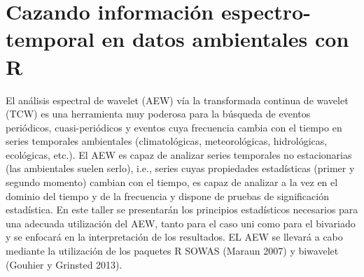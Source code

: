 \chapter{Cazando información espectro-temporal en datos ambientales con R}




El análisis espectral de wavelet (AEW) vía la transformada continua de wavelet (TCW) es una herramienta muy poderosa para la búsqueda  de eventos periódicos, cuasi-periódicos y eventos cuya frecuencia cambia con el tiempo en series temporales ambientales (climatológicas,  meteorológicas, hidrológicas, ecológicas, etc.). El AEW es capaz de analizar series temporales no estacionarias (las ambientales suelen serlo), i.e., series cuyas propiedades estadísticas (primer y segundo momento) cambian con el tiempo, es capaz de analizar a la vez en el dominio del tiempo y de la frecuencia y dispone de pruebas de significación estadística. En este taller se presentarán los principios estadísticos necesarios para una adecuada utilización del AEW, tanto para el caso uni como para el bivariado y se enfocará en la interpretación de los resultados. EL AEW se llevará a cabo mediante la utilización de los paquetes R SOWAS (Maraun 2007) y biwavelet (Gouhier y Grinsted 2013).

